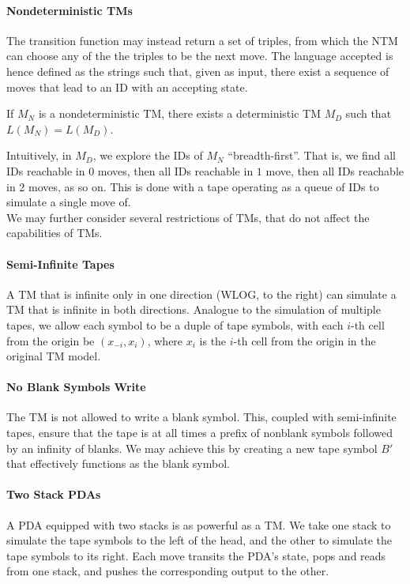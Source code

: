 \paragraph{Nondeterministic TMs} The transition function may instead return a
set of triples, from which the NTM can choose any of the the triples to be the
next move. The language accepted is hence defined as the strings such that,
given as input, there exist a sequence of moves that lead to an ID with an
accepting state.

\begin{theorem}
  If $M_N$ is a nondeterministic TM, there exists a deterministic TM  $M_D$
  such that $L(M_N)=L(M_D)$.
\end{theorem}

Intuitively, in $M_D$, we explore the IDs of $M_N$ ``breadth-first''. That is,
we find all IDs reachable in $0$ moves, then all IDs reachable in $1$ move,
then all IDs reachable in $2$ moves, as so on. This is done with a tape
operating as a queue of IDs to simulate a single move of.\\

We may further consider several restrictions of TMs, that do not affect the
capabilities of TMs.

\paragraph{Semi-Infinite Tapes}  A TM that is infinite only in one
direction (WLOG, to the right) can simulate a TM that is infinite in both
directions. Analogue to the simulation of multiple tapes, we allow each symbol
to be a duple of tape symbols, with each $i$-th cell from the origin be
$(x_{-i}, x_i)$, where $x_i$ is the $i$-th cell from the origin in the original
TM model.

\paragraph{No Blank Symbols Write} The TM is not allowed to write a blank
symbol. This, coupled with semi-infinite tapes, ensure that the tape is at all
times a prefix of nonblank symbols followed by an infinity of blanks. We may
achieve this by creating a new tape symbol $B'$ that effectively functions as
the blank symbol.

\paragraph{Two Stack PDAs} A PDA equipped with two stacks is as powerful as a
TM. We take one stack to simulate the tape symbols to the left of the head, and
the other to simulate the tape symbols to its right. Each move transits the
PDA's state, pops and reads from one stack, and pushes the corresponding output
to the other.



